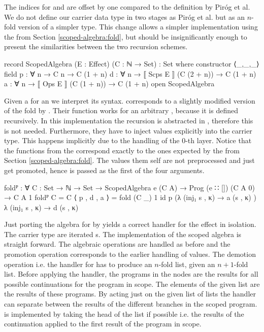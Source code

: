 The indices for  and  are offset by one compared to
the definition by Piróg et al.
We do not define our carrier data type in two stages as Piróg et al. but as an
$n$-fold version of a simpler type.
This change allows a simpler implementation using the  from
Section \ref{scoped-algebra:fold}, but should be insignificantly enough to
present the similarities between the two recursion schemes.

\begin{code}
record ScopedAlgebra (E : Effect) (C : ℕ → Set) : Set where
  constructor ⟨_,_,_⟩
  field
    p : ∀ {n} → C n                      → C (1 + n)
    d : ∀ {n} → ⟦ Scps  E ⟧ (C (2 + n))  → C (1 + n)
    a : ∀ {n} → ⟦ Ops   E ⟧ (C (1 + n))  → C (1 + n)
open ScopedAlgebra
\end{code}
Given a  for an  we
interpret its syntax.
 corresponds to a slightly modified version of the fold by
\textcite{DBLP:conf/lics/PirogSWJ18}.
Their function works for an arbitrary , because it is defined
recursively. 
In this implementation the recursion is abstracted in ,
therefore this is not needed.
Furthermore, they have to inject values explicitly into the carrier type.
This happens implicitly due to the handling of the $0$-th layer.
Notice that the functions from the  correspond
exactly to the ones expected by the  from Section
\ref{scoped-algebra:fold}.
The values them self are not preprocessed and just get promoted, hence
 is passed as the first of the four arguments.

\begin{code}
foldᴾ : ∀ {C : Set → ℕ → Set} → ScopedAlgebra e (C A) → 
  Prog (e ∷ []) (C A 0) → C A 1
foldᴾ {C = C} ⟨ p , d , a ⟩ = fold (C _) 1 id p
  (λ{ (inj₁ s , κ) → a (s , κ) }) λ{ (inj₁ s , κ) → d (s , κ) }
\end{code}
Just porting the algebra for  by
\textcite{DBLP:conf/lics/PirogSWJ18} yields a
correct handler for the effect in isolation.
The carrier type are iterated s.
The implementation of the scoped algebra is straight forward.
The algebraic operations are handled as before and the promotion operation
corresponds to the earlier handling of values.
The demotion operation i.e. the handler for  has
to produce an $n$-fold list, given an $n+1$-fold list.
Before applying the handler, the programs in the 
nodes are the results for all possible continuations for the program in scope.
The elements of the given list are the results of these programs.
By acting just on the given list of lists the handler can separate between the
results of the different branches in the scoped program.
 is implemented by taking the head of the list if possible
i.e. the results of the continuation applied to the first result of the program
in scope.

